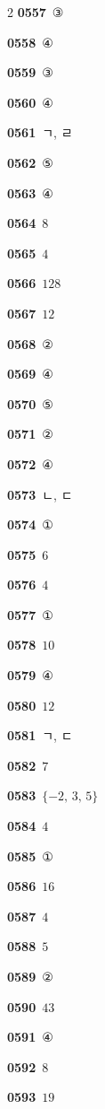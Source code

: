 \documentclass[10pt,a4paper]{article}
\begin{document}
\begin{multicols}{2}
\noindent\textbf{0557}\ ③\par
\noindent\textbf{0558}\ ④\par
\noindent\textbf{0559}\ ③\par
\noindent\textbf{0560}\ ④\par
\noindent\textbf{0561}\ ㄱ, ㄹ\par
\noindent\textbf{0562}\ ⑤\par
\noindent\textbf{0563}\ ④\par
\noindent\textbf{0564}\ $8$\par
\noindent\textbf{0565}\ $4$\par
\noindent\textbf{0566}\ $128$\par
\noindent\textbf{0567}\ $12$\par
\noindent\textbf{0568}\ ②\par
\noindent\textbf{0569}\ ④\par
\noindent\textbf{0570}\ ⑤\par
\noindent\textbf{0571}\ ②\par
\noindent\textbf{0572}\ ④\par
\noindent\textbf{0573}\ ㄴ, ㄷ\par
\noindent\textbf{0574}\ ①\par
\noindent\textbf{0575}\ $6$\par
\noindent\textbf{0576}\ $4$\par
\noindent\textbf{0577}\ ①\par
\noindent\textbf{0578}\ $10$\par
\noindent\textbf{0579}\ ④\par
\noindent\textbf{0580}\ $12$\par
\noindent\textbf{0581}\ ㄱ, ㄷ\par
\noindent\textbf{0582}\ $7$\par
\noindent\textbf{0583}\ $\{-2,\,3,\,5\}$\par
\noindent\textbf{0584}\ $4$\par
\noindent\textbf{0585}\ ①\par
\noindent\textbf{0586}\ $16$\par
\noindent\textbf{0587}\ $4$\par
\noindent\textbf{0588}\ $5$\par
\noindent\textbf{0589}\ ②\par
\noindent\textbf{0590}\ $43$\par
\noindent\textbf{0591}\ ④\par
\noindent\textbf{0592}\ $8$\par
\noindent\textbf{0593}\ $19$\par

\end{multicols}
\end{document}
